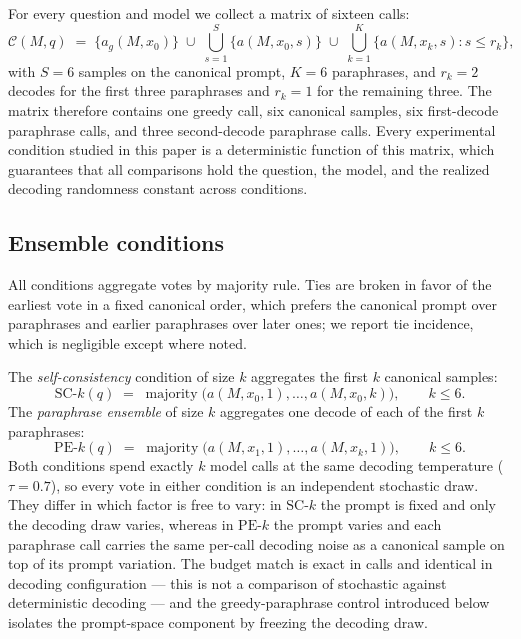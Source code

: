For every question and model we collect a matrix of sixteen calls:
\begin{equation}
\mathcal{C}(M, q) \;=\; \bigl\{ a_g(M, x_0) \bigr\} \;\cup\; \bigcup_{s=1}^{S} \bigl\{ a(M, x_0, s) \bigr\} \;\cup\; \bigcup_{k=1}^{K} \bigl\{ a(M, x_k, s) : s \le r_k \bigr\},
\label{eq:matrix}
\end{equation}
with $S = 6$ samples on the canonical prompt, $K = 6$ paraphrases, and $r_k = 2$ decodes for the first three paraphrases and $r_k = 1$ for the remaining three. The matrix therefore contains one greedy call, six canonical samples, six first-decode paraphrase calls, and three second-decode paraphrase calls. Every experimental condition studied in this paper is a deterministic function of this matrix, which guarantees that all comparisons hold the question, the model, and the realized decoding randomness constant across conditions.

\subsection{Ensemble conditions}

All conditions aggregate votes by majority rule. Ties are broken in favor of the earliest vote in a fixed canonical order, which prefers the canonical prompt over paraphrases and earlier paraphrases over later ones; we report tie incidence, which is negligible except where noted.

The \emph{self-consistency} condition of size $k$ aggregates the first $k$ canonical samples:
\begin{equation}
\mathrm{SC}\text{-}k(q) \;=\; \operatorname*{majority}\bigl( a(M, x_0, 1), \dots, a(M, x_0, k) \bigr), \qquad k \le 6 .
\end{equation}
The \emph{paraphrase ensemble} of size $k$ aggregates one decode of each of the first $k$ paraphrases:
\begin{equation}
\mathrm{PE}\text{-}k(q) \;=\; \operatorname*{majority}\bigl( a(M, x_1, 1), \dots, a(M, x_k, 1) \bigr), \qquad k \le 6 .
\end{equation}
Both conditions spend exactly $k$ model calls at the same decoding temperature ($\tau = 0.7$), so every vote in either condition is an independent stochastic draw. They differ in which factor is free to vary: in $\mathrm{SC}\text{-}k$ the prompt is fixed and only the decoding draw varies, whereas in $\mathrm{PE}\text{-}k$ the prompt varies and each paraphrase call carries the same per-call decoding noise as a canonical sample on top of its prompt variation. The budget match is exact in calls and identical in decoding configuration --- this is not a comparison of stochastic against deterministic decoding --- and the greedy-paraphrase control introduced below isolates the prompt-space component by freezing the decoding draw.

